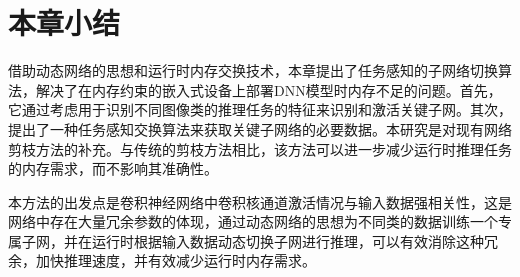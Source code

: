 
\section{本章小结}

借助动态网络的思想和运行时内存交换技术，本章提出了任务感知的子网络切换算法，解决了在内存约束的嵌入式设备上部署DNN模型时内存不足的问题。首先，它通过考虑用于识别不同图像类的推理任务的特征来识别和激活关键子网。其次，提出了一种任务感知交换算法来获取关键子网络的必要数据。本研究是对现有网络剪枝方法的补充。与传统的剪枝方法相比，该方法可以进一步减少运行时推理任务的内存需求，而不影响其准确性。

本方法的出发点是卷积神经网络中卷积核通道激活情况与输入数据强相关性，这是网络中存在大量冗余参数的体现，通过动态网络的思想为不同类的数据训练一个专属子网，并在运行时根据输入数据动态切换子网进行推理，可以有效消除这种冗余，加快推理速度，并有效减少运行时内存需求。



